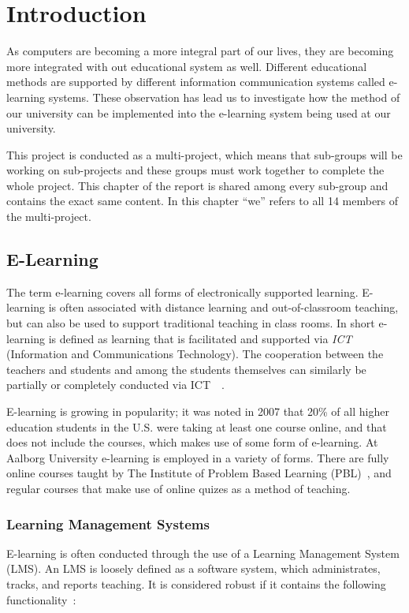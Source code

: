 \chapter{Introduction}
As computers are becoming a more integral part of our lives, they are becoming more integrated with out educational system as well.
Different educational methods are supported by different information communication systems called e-learning systems.
These observation has lead us to investigate how the method of our university can be implemented into the e-learning system being used at our university.

This project is conducted as a multi-project, which means that sub-groups will be working on sub-projects and these groups must work together to complete the whole project.
This chapter of the report is shared among every sub-group and contains the exact same content.
In this chapter ``we'' refers to all 14 members of the multi-project.

\section{E-Learning}
\label{sec:e-learning}
The term e-learning covers all forms of electronically supported learning. 
E-learning is often associated with distance learning and out-of-classroom teaching, but can also be used to support traditional teaching in class rooms. 
In short e-learning is defined as learning that is facilitated and supported via \emph{ICT} (Information and Communications Technology). 
The cooperation between the teachers and students and among the students themselves can similarly be partially or completely conducted via ICT~\cite{def-e-learning1}~\cite{def-e-learning2}.

E-learning is growing in popularity; it was noted in 2007 that 20\% of all higher education students in the U.S. were taking at least one course online, and that does not include the courses, which makes use of some form of e-learning.	
At Aalborg University e-learning is employed in a variety of forms. 
There are fully online courses taught by The Institute of Problem Based Learning (PBL)~\cite{mpbl}, and regular courses that make use of online quizes as a method of teaching.

\subsection{Learning Management Systems}
\label{sub:lms}
E-learning is often conducted through the use of a Learning Management System (LMS). 
An LMS is loosely defined as a software system, which administrates, tracks, and reports teaching. 
It is considered robust if it contains the following functionality~\citep{Ellis09}:

